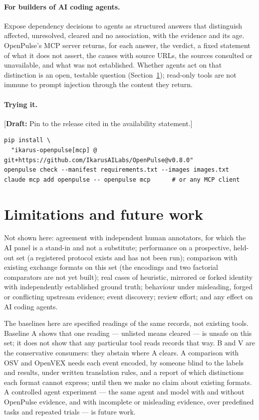 \documentclass[11pt]{article}
\newcommand{\draftnote}[1]{\textcolor{red!70!black}{[\textbf{Draft:} #1]}}
\begin{document}
\paragraph{For builders of AI coding agents.} Expose dependency decisions to
agents as structured answers that distinguish affected, unresolved, cleared
and no association, with the evidence and its age. OpenPulse's MCP server
returns, for each answer, the verdict, a fixed statement of what it does not
assert, the causes with source URLs, the sources consulted or unavailable, and
what was not established. Whether agents act on that distinction is an open,
testable question (Section~\ref{sec:limits}); read-only tools are not immune to
prompt injection through the content they return.

\paragraph{Trying it.} \draftnote{Pin to the release cited in the
availability statement.}
\begin{verbatim}
pip install \
  "ikarus-openpulse[mcp] @ git+https://github.com/IkarusAILabs/OpenPulse@v0.8.0"
openpulse check --manifest requirements.txt --images images.txt
claude mcp add openpulse -- openpulse mcp      # or any MCP client
\end{verbatim}

\section{Limitations and future work}
\label{sec:limits}

Not shown here: agreement with independent human annotators, for which the
AI panel is a stand-in and not a substitute; performance on a
prospective, held-out set (a registered protocol exists and has not been
run); comparison with existing exchange formats on this set (the encodings and
two factorial comparators are not yet built); real cases of heuristic,
mirrored or forked identity with independently established ground truth;
behaviour under misleading, forged or conflicting upstream evidence; event
discovery; review effort; and any effect on AI coding agents.

The baselines here are specified readings of the same records, not existing
tools. Baseline A shows that one reading --- unlisted means cleared --- is
unsafe on this set; it does not show that any particular tool reads records
that way. B and V are the conservative consumers: they abstain where A clears.
A comparison with OSV and OpenVEX needs each event encoded, by someone blind
to the labels and results, under written translation rules, and a report of
which distinctions each format cannot express; until then we make no claim
about existing formats. A controlled agent experiment --- the same
agent and model with and without OpenPulse evidence, and with incomplete or
misleading evidence, over predefined tasks and repeated trials --- is future
work.
\end{document}
